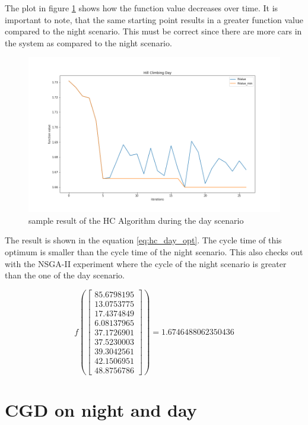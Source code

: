 \documentclass[./\jobname.tex]{subfiles}
\begin{document}
The plot in figure \ref{fig:exp_hc_day_result} shows how the function value decreases over time. It is important to note, that the same starting point results in a greater function value compared to the night scenario. This must be correct since there are more cars in the system as compared to the night scenario. 

\begin{figure}[H]
	\centering
	\includegraphics[width=\textwidth]{../img/png/hc_day.png}
	\caption{sample result of the HC Algorithm during the day scenario}
	\label{fig:exp_hc_day_result}
\end{figure}

The result is shown in the equation \ref{eq:hc_day_opt}. The cycle time of this optimum is smaller than the cycle time of the night scenario. This also checks out with the NSGA-II experiment where the cycle of the night scenario is greater than the one of the day scenario. 

\begin{equation}
f \left( \begin{bmatrix}
85.6798195 \\ 13.0753775 \\ 17.4374849 \\ 6.08137965 \\ 37.1726901 \\ 37.5230003 \\ 39.3042561 \\ 42.1506951 \\ 48.8756786
\end{bmatrix} \right) 
= 1.6746488062350436
\label{eq:hc_day_opt}
\end{equation}


\section{CGD on night and day}
\end{document}
